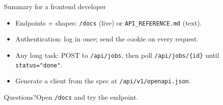 \documentclass[aspectratio=169,11pt]{beamer}
\begin{document}
\begin{frame}{Summary for a frontend developer}
  \vspace{14pt}
  \begin{itemize}\setlength\itemsep{10pt}
    \item Endpoints + shapes: \texttt{/docs} (live) or \texttt{API\_REFERENCE.md} (text).
    \item Authentication: log in once; send the cookie on every request.
    \item Any long task: POST to \texttt{/api/jobs}, then poll \texttt{/api/jobs/\{id\}} until \texttt{status="done"}.
    \item Generate a client from the spec at \texttt{/api/v1/openapi.json}.
  \end{itemize}
  \vspace{18pt}
  \begin{center}\small Questions?\;\;Open \texttt{/docs} and try the endpoint.\end{center}
\end{frame}
\end{document}
